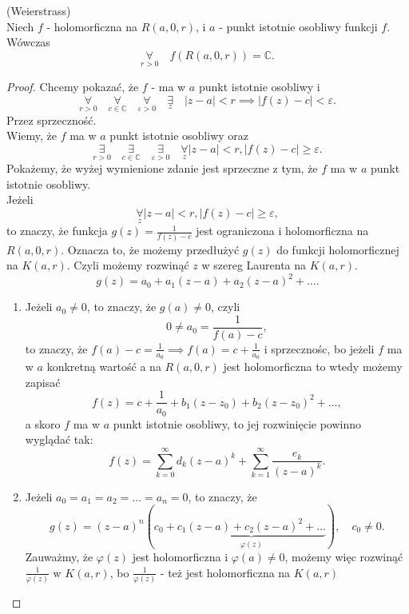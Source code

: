\documentclass[../main.tex]{subfiles}
\begin{document}
\begin{tw}
    (Weierstrass)\\
    Niech $f$ - holomorficzna na $R(a,0,r)$, i $a$ - punkt istotnie osobliwy funkcji $f$. Wówczas
    \[
        \underset{r>0}{\forall} \quad f(R(a,0,r)) = \mathbb{C}
    .\]
\end{tw}
\begin{proof}
    Chcemy pokazać, że $f$ - ma w $a$ punkt istotnie osobliwy i
    \[
        \underset{r > 0}{\forall} \quad \underset{c\in \mathbb{C}}{\forall} \quad \underset{\varepsilon > 0}{\forall} \quad \underset{z}{\exists} \quad \left| z-a \right| < r \implies \left| f(z) - c \right| < \varepsilon
    .\]
Przez sprzeczność.\\
Wiemy, że $f$ ma w $a$ punkt istotnie osobliwy oraz
\[
    \underset{r > 0}{\exists} \quad \underset{c\in\mathbb{C}}{\exists} \quad \underset{\varepsilon > 0}{\exists} \quad \underset{z}{\forall} \left| z-a \right| < r , \left| f(z) - c \right| \ge \varepsilon
.\]
Pokażemy, że wyżej wymienione zdanie jest sprzeczne z tym, że $f$ ma w $a$ punkt istotnie osobliwy.\\
Jeżeli
\[
    \underset{z}{\forall} \left| z - a \right| < r, \left| f(z) - c \right| \ge \varepsilon
,\]
to znaczy, że funkcja $g(z) = \frac{1}{f(z) - c}$ jest ograniczona i holomorficzna na $R(a,0,r)$. Oznacza to, że możemy przedłużyć $g(z)$ do funkcji holomorficznej na $K(a,r)$. Czyli możemy rozwinąć $z$ w szereg Laurenta na $K(a,r)$.
\[
    g(z) = a_0 + a_1(z-a) + a_2(z-a)^2 + \ldots
.\]
\begin{enumerate}[\textit{i})]
    \item Jeżeli $a_0 \neq 0$, to znaczy, że $g(a) \neq 0$, czyli
         \[
             0 \neq a_0 = \frac{1}{f(a) - c}
        ,\]
    to znaczy, że $f(a) - c = \frac{1}{a_0} \implies f(a) = c+ \frac{1}{a_0}$ i sprzecznośc, bo jeżeli $f$ ma w $a$ konkretną wartość a na $R(a,0,r)$ jest holomorficzna to wtedy możemy zapisać
        \[
            f(z) = c + \frac{1}{a_0} + b_1(z-z_0) + b_2(z-z_0)^2 + \ldots
        ,\]
    a skoro $f$ ma w $a$ punkt istotnie osobliwy, to jej rozwinięcie powinno wyglądać tak:
        \[
            f(z) = \sum_{k = 0}^{\infty} d_k(z-a)^k + \sum_{k = 1}^{\infty} \frac{e_k}{(z-a)^k}
        .\]
\item Jeżeli $a_0 = a_1 = a_2 = \ldots = a_n =  0$, to znaczy, że
        \[
            g(z) = (z-a)^n\left( c_0 + \underbrace{c_1(z-a) + c_2(z-a)^2 + \ldots }_{\varphi(z)}\right),\quad c_0 \neq 0
        .\]
    Zauważmy, że $\varphi(z)$ jest holomorficzna i $\varphi(a) \neq 0$, możemy więc rozwinąć $\frac{1}{\varphi(z)}$ w $K(a,r)$, bo $\frac{1}{\varphi(z)}$ - też jest holomorficzna na $K(a,r)$

\end{enumerate}
\end{proof}
\end{document}
